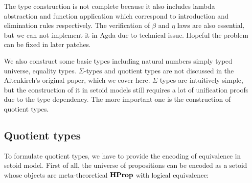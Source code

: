 The type construction is not complete because it also includes lambda abstraction and function application which correspond to introduction and elimination rules respectively. The verification of $\beta$ and $\eta$ laws are also essential, but we can not implement it in Agda due to technical issue. Hopeful the problem can be fixed in later patches.

We also construct some basic types including natural numbers simply typed universe, equality types. $\Sigma$-types and quotient types are not discussed in the Altenkirch's original paper, which we cover here. $\Sigma$-types are intuitively simple, but the construction of it in setoid models still requires a lot of unification proofs due to the type dependency. The more important one is the construction of quotient types.


\subsection{Quotient types}

To formulate quotient types, we have to provide the encoding of equivalence in setoid model. First of all, the universe of propositions can be encoded as a setoid whose objects are meta-theoretical $\textbf{HProp}$ with logical equivalence:

